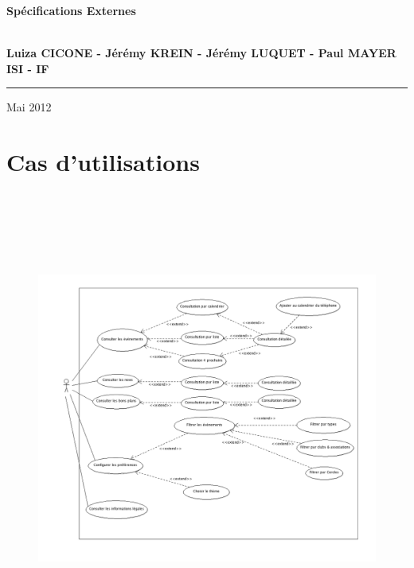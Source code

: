 \documentclass[a4paper, 11px]{article}
\begin{document}
\begin{titlepage}
\begin{center}
\begin{center}
{\Huge \bf Spécifications Externes}


\end{center}


\vspace{1cm}

\begin{center}
$ $\\
\large{ \textbf{Luiza CICONE - Jérémy KREIN - Jérémy LUQUET - Paul MAYER}}\\
\large{ \textbf{ISI - IF}}
$ $\\
\end{center}
\rule{\linewidth}{.5pt}


\vfill


{\large Mai 2012}

\end{center}
\end{titlepage}

\tableofcontents

\newpage

\section{Cas d'utilisations}
\begin{figure}[h!]
\includegraphics[width=20cm,height=15cm]{cas_utilisation.png}
\end{figure}
\end{document}
